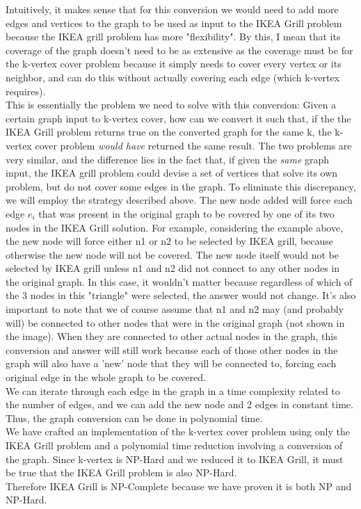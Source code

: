 \documentclass[10pt]{article}
\begin{document}
{    Intuitively, it makes sense that for this conversion we would need to add more edges and vertices to the graph to be used as input to the IKEA Grill problem because the IKEA grill problem has more "flexibility". By this, I mean that its coverage of the graph doesn't need to be as extensive as the coverage must be for the k-vertex cover problem because it simply needs to cover every vertex or its neighbor, and can do this without actually covering each edge (which k-vertex requires). \\
    This is essentially the problem we need to solve with this conversion: Given a certain graph input to k-vertex cover, how can we convert it such that, if the the IKEA Grill problem returns true on the converted graph for the same k, the k-vertex cover problem \emph{would have} returned the same result. The two problems are very similar, and the difference lies in the fact that, if given the \emph{same} graph input, the IKEA grill problem could devise a set of vertices that solve its own problem, but do not cover some edges in the graph. To eliminate this discrepancy, we will employ the strategy described above. The new node added will force each edge $e_i$ that was present in the original graph to be covered by one of its two nodes in the IKEA Grill solution. For example, considering the example above, the new node will force either n1 or n2 to be selected by IKEA grill, because otherwise the new node will not be covered. The new node itself would not be selected by IKEA grill unless n1 and n2 did not connect to any other nodes in the original graph. In this case, it wouldn't matter because regardless of which of the 3 nodes in this "triangle" were selected, the answer would not change. It's also important to note that we of course assume that n1 and n2 may (and probably will) be connected to other nodes that were in the original graph (not shown in the image). When they are connected to other actual nodes in the graph, this conversion and answer will still work because each of those other nodes in the graph will also have a 'new' node that they will be connected to, forcing each original edge in the whole graph to be covered. \\
    We can iterate through each edge in the graph in a time complexity related to the number of edges, and we can add the new node and 2 edges in constant time. Thus, the graph conversion can be done in polynomial time. \\
    We have crafted an implementation of the k-vertex cover problem using only the IKEA Grill problem and a polynomial time reduction involving a conversion of the graph. Since k-vertex is NP-Hard and we reduced it to IKEA Grill, it must be true that the IKEA Grill problem is also NP-Hard. \\
    Therefore IKEA Grill is NP-Complete because we have proven it is both NP and NP-Hard.
}
\end{document}
